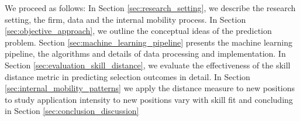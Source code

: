 \documentclass{article}
\begin{document}
We proceed as follows: In Section \ref{sec:research_setting}, we describe the research setting, the firm, data and the internal mobility process. In Section \ref{sec:objective_approach}, we outline the conceptual ideas of the prediction problem. Section \ref{sec:machine_learning_pipeline} presents the machine learning pipeline, the algorithms and details of data processing and implementation. In Section \ref{sec:evaluation_skill_distance}, we evaluate the effectiveness of the skill distance metric in predicting selection outcomes in detail. In Section \ref{sec:internal_mobility_patterns} we apply the distance measure to new positions to study application intensity to new positions vary with skill fit and concluding in Section \ref{sec:conclusion_discussion}
\end{document}
